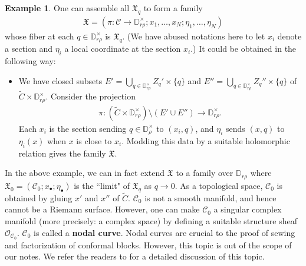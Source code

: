 \documentclass[11pt,b5paper,notitlepage]{article}
\theoremstyle{definition}
\newtheorem{eg}[df]{Example}
\theoremstyle{plain}
\newcommand{\fk}{\mathfrak}
\newcommand{\mc}{\mathcal}
\newcommand{\wtd}{\widetilde}
\newcommand{\scr}{\mathscr}
\newcommand{\blt}{\bullet}
\newcommand{\Dbb}{\mathbb D}
\numberwithin{equation}{section}
\begin{document}
\begin{eg}
One can assemble all $\fk X_q$ to form a family
\begin{align*}
\fk X=(\pi:\mc C\rightarrow\Dbb_{r\rho}^\times;x_1,\dots,x_N;\eta_1,\dots,\eta_N)
\end{align*}
whose fiber at each $q\in\Dbb_{r\rho}^\times$ is $\fk X_q$. (We have abused notations here to let $x_i$ denote a section and $\eta_i$ a local coordinate at the section $x_i$.) It could be obtained in the following way:
\begin{itemize}
\item We have closed subsets $E'=\bigcup_{q\in\Dbb_{r\rho}^\times} Z_q'\times \{q\}$ and $E''=\bigcup_{q\in\Dbb_{r\rho}^\times} Z_q''\times\{q\}$ of $\wtd C\times\Dbb_{r\rho}^\times$. Consider the projection
\begin{align*}
\pi: (\wtd C\times\Dbb_{r\rho}^\times)\setminus (E'\cup E'')\rightarrow \Dbb_{r\rho}^\times.
\end{align*}
Each $x_i$ is the section sending $q\in\Dbb_{\rho}^\times$ to $(x_i,q)$, and $\eta_i$ sends $(x,q)$ to $\eta_i(x)$ when $x$ is close to $x_i$. Modding this data by a suitable holomorphic relation gives the family $\fk X$.
\end{itemize}
\hfill \qedsymbol
\end{eg}

In the above example, we can in fact extend $\fk X$ to a family over $\Dbb_{r\rho}$ where $\fk X_0=(\mc C_0;x_\blt;\eta_\blt)$ is the ``limit" of $\fk X_q$ as $q\rightarrow0$. As a topological space, $\mc C_0$ is obtained by gluing $x'$ and $x''$ of $\wtd C$. $\mc C_0$ is not a smooth manifold, and hence cannot be a Riemann surface. However, one can make $\mc C_0$ a singular complex manifold (more precisely: a complex space) by defining a suitable structure sheaf $\scr O_{\mc C_0}$. $\mc C_0$ is called a \textbf{nodal curve}. Nodal curves are crucial to the proof of sewing and factorization of conformal blocks. However, this topic is out of the scope of our notes. We refer the readers to \cite{Gui} for a detailed discussion of this topic.






\subsection{}
\end{document}
